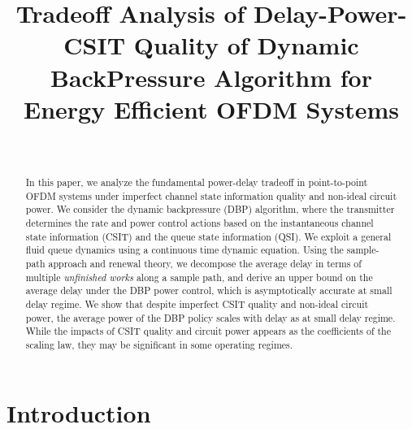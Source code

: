 \documentclass[11pt,journal, onecolumn]{./IEEEtran}
\newcommand{\red}{\color{black}}
\begin{document}
\title{Tradeoff Analysis of Delay-Power-CSIT Quality of Dynamic BackPressure Algorithm for Energy Efficient OFDM Systems}

\author{\\}

\maketitle
\begin{abstract}
In this paper, we analyze the fundamental power-delay tradeoff in point-to-point OFDM systems under imperfect channel state information quality and non-ideal circuit power. We consider the dynamic backpressure (DBP) algorithm, where the transmitter determines the rate and power control actions based on the instantaneous channel state information (CSIT) and the queue state information (QSI). We exploit a general fluid queue dynamics using a continuous time dynamic equation. Using the sample-path approach and renewal theory, we decompose the average delay in terms of multiple {\em unfinished works} along a sample path, and derive an upper bound on the average delay under the DBP power control, which is asymptotically accurate at small delay regime. We show that despite imperfect CSIT quality and non-ideal circuit power, the average power  of the DBP policy scales with delay  as  at small delay regime. {\red While the impacts of CSIT quality and circuit power appears as the coefficients of the scaling law, they may be significant in some operating regimes. }
\end{abstract}

\newtheorem{Result}{Result}
\newtheorem{Problem}{Problem}
\newtheorem{Definition}{Definition}
\newtheorem{Lemma}{Lemma}
\newtheorem{Assumption}{Assumption}
\newtheorem{Remark}{Remark}
\newtheorem{Theorem}{Theorem}
\newtheorem{Corollary}{Corollary}




\section{Introduction}
\end{document}

